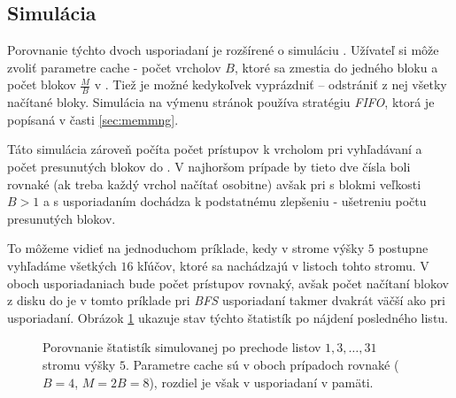 \subsection{Simulácia \cache}
Porovnanie týchto dvoch usporiadaní je rozšírené o simuláciu \cache. Užívateľ si môže zvoliť parametre cache - počet vrcholov $B$, ktoré sa zmestia do jedného bloku a počet blokov $\frac{M}{B}$ v \cache. Tiež je možné \cache kedykoľvek vyprázdniť -- odstrániť z nej všetky načítané bloky. Simulácia na výmenu stránok používa stratégiu \emph{FIFO}, ktorá je popísaná v časti \ref{sec:memmng}.

Táto simulácia zároveň počíta počet prístupov k vrcholom pri vyhľadávaní a počet presunutých blokov do \cache. V najhoršom prípade by tieto dve čísla boli rovnaké (ak treba každý vrchol načítať osobitne) avšak pri \cache s blokmi veľkosti $B > 1$ a s \vEB usporiadaním dochádza k podstatnému zlepšeniu - ušetreniu počtu presunutých blokov.

To môžeme vidieť na jednoduchom príklade, kedy v strome výšky $5$ postupne vyhľadáme všetkých $16$ kľúčov, ktoré sa nachádzajú v listoch tohto stromu. V oboch usporiadaniach bude počet prístupov rovnaký, avšak počet načítaní blokov z disku do \cache je v tomto príklade pri \emph{BFS} usporiadaní takmer dvakrát väčší ako pri \vEB usporiadaní. Obrázok \ref{fig:ss_cachesim_compare} ukazuje stav týchto štatistík po nájdení posledného listu.

\begin{figure}[h]
    \centering
    \hspace{1cm}
    \caption{Porovnanie štatistík simulovanej \cache po prechode listov $1,3,\dotsc,31$ stromu výšky $5$. Parametre cache sú v oboch prípadoch rovnaké ($B=4$, $M=2B=8$), rozdiel je však v usporiadaní v pamäti.}
    \label{fig:ss_cachesim_compare}
\end{figure}

